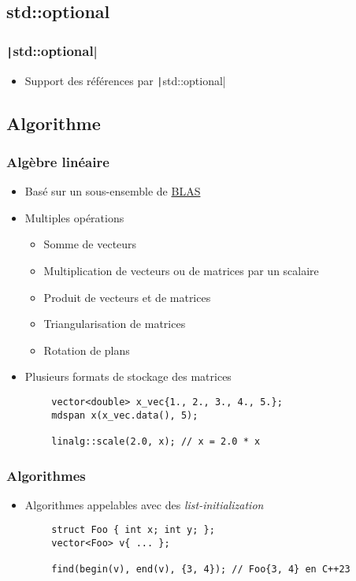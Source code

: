 \documentclass[C++.tex]{subfiles}
\begin{document}
\subsection*{std::optional}
\begin{frame}[fragile]
	\frametitle{\texttt|std::optional|}
	\begin{itemize}
		\item Support des références par \texttt|std::optional|
	\end{itemize}

\end{frame}

\subsection*{Algorithme}
\begin{frame}[fragile]
	\frametitle{Algèbre linéaire}
	\begin{itemize}
		\item Basé sur un sous-ensemble de \href{https://www.netlib.org/blas/}{BLAS\linklogo}
		\item Multiples opérations
		\begin{itemize}
			\item Somme de vecteurs
			\item Multiplication de vecteurs ou de matrices par un scalaire
			\item Produit de vecteurs et de matrices
			\item Triangularisation de matrices
			\item Rotation de plans
		\end{itemize}
		\item Plusieurs formats de stockage des matrices
	\end{itemize}

	\begin{verbatim}
		vector<double> x_vec{1., 2., 3., 4., 5.};
		mdspan x(x_vec.data(), 5);

		linalg::scale(2.0, x); // x = 2.0 * x
	\end{verbatim}

\end{frame}

\begin{frame}[fragile]
	\frametitle{Algorithmes}
	\begin{itemize}
		\item Algorithmes appelables avec des \textit{list-initialization}
	\end{itemize}

	\begin{verbatim}
		struct Foo { int x; int y; };
		vector<Foo> v{ ... };

		find(begin(v), end(v), {3, 4}); // Foo{3, 4} en C++23
	\end{verbatim}

\end{frame}
\end{document}
